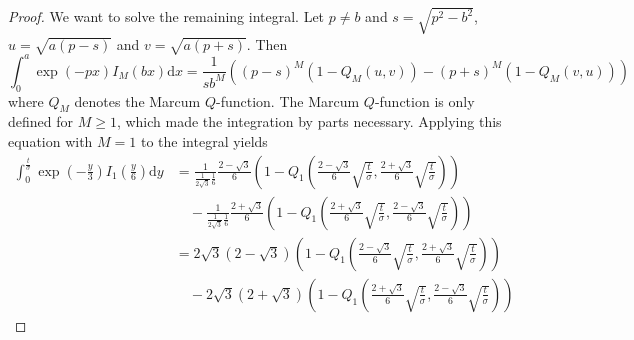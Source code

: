 \documentclass[a4paper,12pt]{article}
\theoremstyle{plain}
\theoremstyle{definition}
\begin{document}
\begin{proof}
	We want to solve the remaining integral. Let $p \neq b$ and $s = \sqrt{p^2 - b^2}$, $u = \sqrt{a (p - s)}$ and $v = \sqrt{a (p + s)}$. Then\cite{IntQFunction}
	\begin{equation}\label{eqintmarcum}
		\int_0^a \exp(-p x) I_M ( b x ) \mathrm{d}x = \frac{1}{s b^M} \left( (p - s)^M ( 1 - Q_M(u, v) ) - (p + s)^M ( 1 - Q_M(v, u) ) \right)
	\end{equation}
	where $Q_M$ denotes the Marcum $Q$-function. The Marcum $Q$-function is only defined for $M \geq 1$, which made the integration by parts necessary. Applying this equation with $M = 1$ to the integral yields
	\begin{align*}
		\int_0^\frac{t}{\sigma} \exp \left( - \frac{y}{3} \right) I_1 \left( \frac{y}{6} \right) \mathrm{d}y &= \frac{1}{\frac{1}{2 \sqrt{3}} \frac{1}{6}} \frac{2 - \sqrt{3}}{6} \left( 1 - Q_1 \left( \frac{2 - \sqrt{3}}{6} \sqrt{\frac{t}{\sigma}}, \frac{2 + \sqrt{3}}{6} \sqrt{\frac{t}{\sigma}} \right) \right) \\
		&\quad - \frac{1}{\frac{1}{2 \sqrt{3}} \frac{1}{6}} \frac{2 + \sqrt{3}}{6} \left( 1 - Q_1 \left( \frac{2 + \sqrt{3}}{6} \sqrt{\frac{t}{\sigma}}, \frac{2 - \sqrt{3}}{6} \sqrt{\frac{t}{\sigma}} \right) \right) \\
		&= 2 \sqrt{3} (2 - \sqrt{3}) \left( 1 - Q_1 \left( \frac{2 - \sqrt{3}}{6} \sqrt{\frac{t}{\sigma}}, \frac{2 + \sqrt{3}}{6} \sqrt{\frac{t}{\sigma}} \right) \right) \\
		&\quad - 2 \sqrt{3} (2 + \sqrt{3}) \left( 1 - Q_1 \left( \frac{2 + \sqrt{3}}{6} \sqrt{\frac{t}{\sigma}}, \frac{2 - \sqrt{3}}{6} \sqrt{\frac{t}{\sigma}} \right) \right)
	\end{align*}
	

\end{proof}
\end{document}
